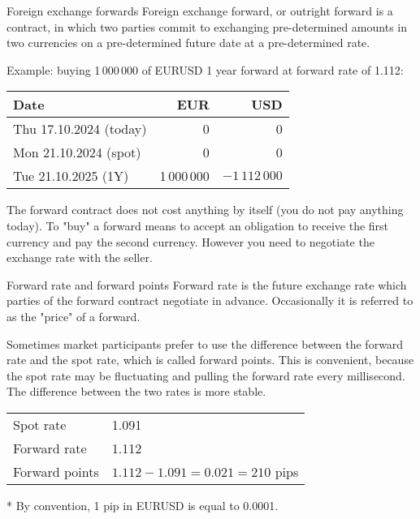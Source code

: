 \documentclass{beamer}
\begin{document}
\begin{frame}{Foreign exchange forwards}
\justify
\alert{Foreign exchange forward, or outright forward} is a contract, in which two parties commit to exchanging pre-determined amounts in two currencies on a pre-determined future date at a pre-determined rate. 

\justify
Example: buying 1\,000\,000 of EURUSD 1 year forward at forward rate of 1.112:

\centering
\begin{tabular}{l|r|r}
Date                          & EUR & USD \\ \hline
Thu 17.10.2024 (today)  & 0   & 0   \\
Mon 21.10.2024 (spot) & 0   & 0   \\
Tue 21.10.2025 (1Y)   & 1\,000\,000 & $-1\,112\,000$
\end{tabular}

\justify
The forward contract does not cost anything by itself (you do not pay anything today). To "buy" a forward means to accept an obligation to receive the first currency and pay the second currency. However you need to negotiate the exchange rate with the seller.
\end{frame}



\begin{frame}{Forward rate and forward points}
\justify
\alert{Forward rate} is the future exchange rate which parties of the forward contract negotiate in advance. Occasionally it is
referred to as the "price" of a forward.

\justify
Sometimes market participants prefer to use the difference between the forward rate and the spot rate, which is called \alert{forward points}. This is convenient, because the spot rate may be fluctuating and pulling the forward rate every millisecond. The difference between the two rates is more stable.

\vspace{\baselineskip}
\centering
\begin{tabular}{l|l}
Spot rate & 1.091 \\
Forward rate & 1.112 \\
\hline
Forward points & $1.112 - 1.091 = 0.021 = 210$ pips
\end{tabular}

\justify
* By convention, 1 pip in EURUSD is equal to 0.0001.
\end{frame}
\end{document}

